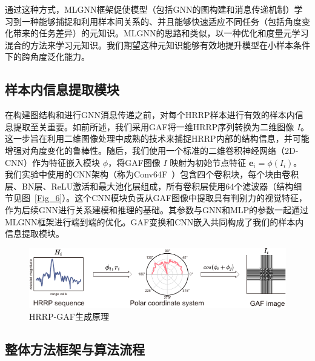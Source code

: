 通过这种方式，MLGNN框架促使模型（包括GNN的图构建和消息传递机制）学习到一种能够捕捉和利用样本间关系的、并且能够快速适应不同任务（包括角度变化带来的任务差异）的元知识。MLGNN的思路和\cite{wang_hybrid_2019}类似，以一种优化和度量元学习混合的方法来学习元知识。我们期望这种元知识能够有效地提升模型在小样本条件下的跨角度泛化能力。

\subsection{样本内信息提取模块}
\label{subsec:intra_sample_module}

在构建图结构和进行GNN消息传递之前，对每个HRRP样本进行有效的样本内信息提取至关重要。如前所述，我们采用GAF将一维HRRP序列转换为二维图像 $I$。这一步旨在利用二维图像处理中成熟的技术来捕捉HRRP内部的结构信息，并可能增强对角度变化的鲁棒性。随后，我们使用一个标准的二维卷积神经网络（2D-CNN）作为特征嵌入模块 $\phi$，将GAF图像 $I$ 映射为初始节点特征 $\mathbf{e}_i = \phi(I_i)$。我们实验中使用的CNN架构（称为Conv64F~\cite{ref33}）包含四个卷积块，每个块由卷积层、BN层、ReLU激活和最大池化层组成，所有卷积层使用64个滤波器（结构细节见图~\ref{Fig_6}）。这个CNN模块负责从GAF图像中提取具有判别力的视觉特征，作为后续GNN进行关系建模和推理的基础。其参数与GNN和MLP的参数一起通过MLGNN框架进行端到端的优化。GAF变换和CNN嵌入共同构成了我们的样本内信息提取模块。

\begin{figure}[h]
    \centering
    \includegraphics[width=0.8\linewidth]{figures/gaf.pdf} %
    \caption{HRRP-GAF生成原理}
    \label{fig:dataset_chap3}
\end{figure}

\subsection{整体方法框架与算法流程}
\label{subsec:overall_framework_angle}

